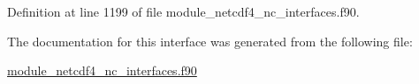 Definition at line 1199 of file module\+\_\+netcdf4\+\_\+nc\+\_\+interfaces.\+f90.



The documentation for this interface was generated from the following file\+:\begin{DoxyCompactItemize}
\item 
\hyperlink{module__netcdf4__nc__interfaces_8f90}{module\+\_\+netcdf4\+\_\+nc\+\_\+interfaces.\+f90}\end{DoxyCompactItemize}

